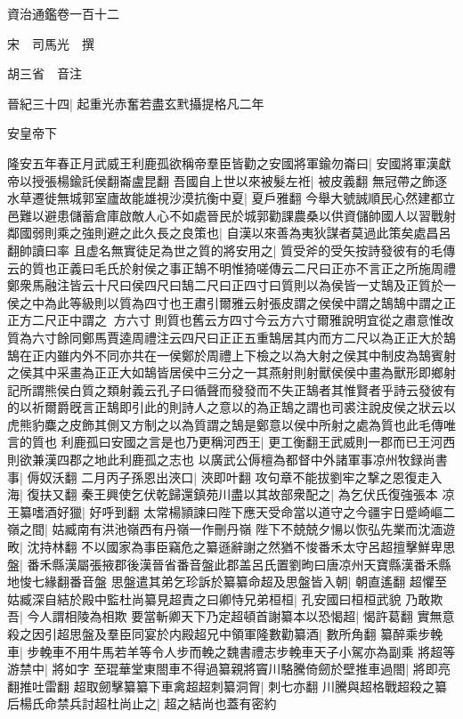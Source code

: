 資治通鑑卷一百十二

宋　司馬光　撰

胡三省　音注

晉紀三十四|{
	起重光赤奮若盡玄黓攝提格凡二年}


安皇帝下

隆安五年春正月武威王利鹿孤欲稱帝羣臣皆勸之安國將軍鍮勿崙曰|{
	安國將軍漢獻帝以授張楊鍮託侯翻崙盧昆翻}
吾國自上世以來被髮左袵|{
	被皮義翻}
無冠帶之飾逐水草遷徙無城郭室廬故能雄視沙漠抗衡中夏|{
	夏戶雅翻}
今舉大號誠順民心然建都立邑難以避患儲蓄倉庫啟敵人心不如處晉民於城郭勸課農桑以供資儲帥國人以習戰射鄰國弱則乘之強則避之此久長之良策也|{
	自漢以來善為夷狄謀者莫過此策矣處昌呂翻帥讀曰率}
且虚名無實徒足為世之質的將安用之|{
	質受斧的受矢按詩發彼有的毛傳云的質也正義曰毛氏於射侯之事正鵠不明惟猗嗟傳云二尺曰正亦不言正之所施周禮鄭衆馬融注皆云十尺曰侯四尺曰鵠二尺曰正四寸曰質則以為侯皆一丈鵠及正質於一侯之中為此等級則以質為四寸也王肅引爾雅云射張皮謂之侯侯中謂之鵠鵠中謂之正正方二尺正中謂之方六寸則質也舊云方四寸今云方六寸爾雅說明宜從之肅意惟改質為六寸餘同鄭馬賈逵周禮注云四尺曰正正五重鵠居其内而方二尺以為正正大於鵠鵠在正内雖内外不同亦共在一侯鄭於周禮上下檢之以為大射之侯其中制皮為鵠賓射之侯其中采畫為正正大如鵠皆居侯中三分之一其燕射則射獸侯侯中畫為獸形即鄉射記所謂熊侯白質之類射義云孔子曰循聲而發發而不失正鵠者其惟賢者乎詩云發彼有的以祈爾爵旣言正鵠即引此的則詩人之意以的為正鵠之謂也司裘注說皮侯之狀云以虎熊豹麋之皮飾其側又方制之以為質謂之鵠是鄭意以侯中所射之處為質也此毛傳唯言的質也}
利鹿孤曰安國之言是也乃更稱河西王|{
	更工衡翻王武威則一郡而已王河西則欲兼漢四郡之地此利鹿孤之志也}
以廣武公傉檀為都督中外諸軍事凉州牧録尚書事|{
	傉奴沃翻}
二月丙子孫恩出浹口|{
	浹即叶翻}
攻句章不能拔劉牢之撃之恩復走入海|{
	復扶又翻}
秦王興使乞伏乾歸還鎮苑川盡以其故部衆配之|{
	為乞伏氏復強張本}
凉王纂嗜酒好獵|{
	好呼到翻}
太常楊頴諫曰陛下應天受命當以道守之今疆宇日蹙崎嶇二嶺之間|{
	姑臧南有洪池嶺西有丹嶺一作刪丹嶺}
陛下不兢兢夕愓以恢弘先業而沈湎遊畋|{
	沈持林翻}
不以國家為事臣竊危之纂遜辭謝之然猶不悛番禾太守呂超擅擊鮮卑思盤|{
	番禾縣漢屬張掖郡後漢晉省番音盤此郡盖呂氏置劉昫曰唐凉州天寶縣漢番禾縣地悛七緣翻番音盤}
思盤遣其弟乞珍訴於纂纂命超及思盤皆入朝|{
	朝直遙翻}
超懼至姑臧深自結於殿中監杜尚纂見超責之曰卿恃兄弟桓桓|{
	孔安國曰桓桓武貌}
乃敢欺吾|{
	今人謂相陵為相欺}
要當斬卿天下乃定超頓首謝纂本以恐愒超|{
	愒許葛翻}
實無意殺之因引超思盤及羣臣同宴於内殿超兄中領軍隆數勸纂酒|{
	數所角翻}
纂醉乘步輓車|{
	步輓車不用牛馬若羊等令人步而輓之魏書禮志步輓車天子小駕亦為副乘}
將超等游禁中|{
	將如字}
至琨華堂東閤車不得過纂親將竇川駱騰倚劒於壁推車過閤|{
	將即亮翻推吐雷翻}
超取劒擊纂纂下車禽超超刺纂洞胷|{
	刺七亦翻}
川騰與超格戰超殺之纂后楊氏命禁兵討超杜尚止之|{
	超之結尚也蓋有密約}
